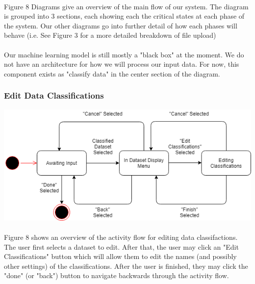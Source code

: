 \documentclass[12pt,oneside,letterpaper]{article}
\begin{document}
\paragraph{}Figure 8 Diagrams give an overview of the main flow of our system. The diagram is grouped into 3 sections, each showing each the critical states at each phase of the system. Our other diagrams go into further detail of how each phases will behave (i.e. See Figure 3 for a more detailed breakdown of file upload)

\paragraph{}Our machine learning model is still mostly a "black box" at the moment. We do not have an architecture for how we will process our input data. For now, this component exists as "classify data" in the center section of the diagram.

 \subsubsection{Edit Data Classifications}
\includegraphics[scale = 0.70]{bread_state_diagram.png}
\begingroup
{}
\endgroup

\paragraph{}Figure 8 shows an overview of the activity flow for editing data classifactions. The user first selects a dataset to edit. After that, the user may click an "Edit Classifications" button which will allow them to edit the names (and possibly other settings) of the classifications. After the user is finished, they may click the "done" (or "back") button to navigate backwards through the activity flow.
\end{document}
